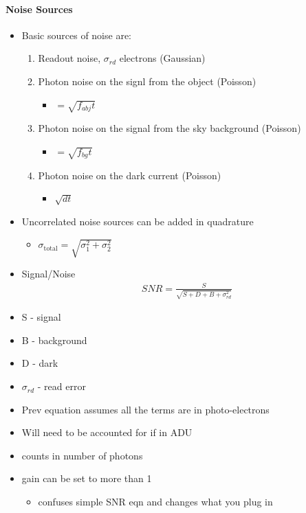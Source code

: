 \documentclass[a4paper,11pt,normalem]{article}
\begin{document}
\paragraph{Noise Sources}
\begin{itemize}
    \item Basic sources of noise are:
        \begin{enumerate}
            \item Readout noise, \(\sigma_{rd}\) electrons (Gaussian)
            \item Photon noise on the signl from the object (Poisson)
                \begin{itemize}
                    \item \(= \sqrt{f_{abj}t}\)
                \end{itemize}
            \item Photon noise on the signal from the sky background (Poisson)
                \begin{itemize}
                    \item \(= \sqrt{f_{bg}t}\)
                \end{itemize}
            \item Photon noise on the dark current (Poisson)
                \begin{itemize}
                    \item \(\sqrt{dt}\)
                \end{itemize}
        \end{enumerate}
    \item Uncorrelated noise sources can be added in quadrature
        \begin{itemize}
            \item \(\sigma_{\text{total}} = \sqrt{\sigma_{1}^{2} + \sigma_{2}^{2}}\)
        \end{itemize}
    \item Signal/Noise
        \begin{align*}
            SNR = \frac{S}{\sqrt{S + D + B + \sigma_{rd}^2}}
        \end{align*}
    \item S - signal
    \item B - background
    \item D - dark
    \item \(\sigma_{rd}\) - read error
    \item Prev equation assumes all the terms are in photo-electrons
    \item Will need to be accounted for if in ADU
    \item counts in number of photons
    \item gain can be set to more than 1
        \begin{itemize}
            \item confuses simple SNR eqn and changes what you plug in
        \end{itemize}
\end{itemize}
\end{document}
